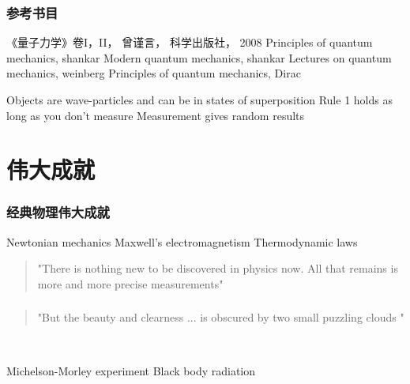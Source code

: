 \begin{frame}[t]
    \frametitle{参考书目}
        \begin{itemize}
            \Item 《量子力学》卷I，II， 曾谨言， 科学出版社， 2008           
            \Item Principles of quantum mechanics, shankar
            \Item Modern quantum mechanics, shankar
            \Item Lectures on quantum mechanics, weinberg
            \Item Principles of quantum mechanics, Dirac
        \end{itemize}
\end{frame}

\begin{frame}[t]
    \begin{tcolorbox4}[三条军规]    
        \begin{enumerate}
            \Item Objects are wave-particles and can be in states of superposition
            \Item Rule 1 holds as long as you don't measure
            \Item Measurement gives random results
        \end{enumerate}
    \end{tcolorbox4} 
\end{frame}

\section{伟大成就}

\begin{frame}[t]
    \frametitle{经典物理伟大成就}
    \begin{tcolorbox3}
        \begin{enumerate}
            \Item Newtonian mechanics
            \Item Maxwell's electromagnetism
            \Item Thermodynamic laws
        \end{enumerate}
    \end{tcolorbox3}  
    \begin{quotation}
        "There is nothing new to be discovered in physics now. All that remains is 
        more and more precise measurements"   \\
    \end{quotation}
\end{frame}

\begin{frame}
    \frametitle{}
    \begin{quotation}
        "But the beauty and clearness ... is obscured by two small puzzling clouds \faCloud "  \\
    \end{quotation}
    ~~ \vspace{0.3em}
    \begin{tcolorbox4}[两朵乌云]    
        \begin{enumerate}
        \Item Michelson-Morley experiment
        \Item Black body radiation
        \end{enumerate}
    \end{tcolorbox4} 
\end{frame}

